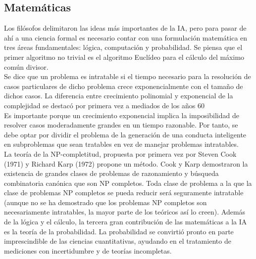 \documentclass[12pt,a4paper]{report}
\begin{document}
\subsection*{Matemáticas}
Los filósofos delimitaron las ideas más importantes de la IA, pero para pasar de ahí a una ciencia formal es necesario contar con una formulación matemática en tres áreas fundamentales: lógica, computación y probabilidad. Se piensa que el primer algoritmo no trivial es el algoritmo Euclídeo para el cálculo del máximo común divisor.\\Se dice que un problema es intratable si el tiempo necesario para la resolución de casos particulares de dicho problema crece exponencialmente con el tamaño de dichos casos. La diferencia entre crecimiento polinomial y exponencial de la complejidad se destacó por primera vez a mediados de los años 60\\
Es importante porque un crecimiento exponencial implica la imposibilidad de resolver casos moderadamente grandes en un tiempo razonable. Por tanto, se debe optar por dividir el problema de la generación de una conducta inteligente en subproblemas que sean tratables en vez de manejar problemas intratables.\\
La teoría de la NP-completitud, propuesta por primera vez por Steven Cook (1971) y Richard Karp (1972) propone un método. Cook y Karp demostraron la existencia de grandes clases de problemas de razonamiento y búsqueda combinatoria canónica que son NP completos. Toda clase de problema a la que la clase de problemas NP completos se pueda reducir será seguramente intratable (aunque no se ha demostrado que los problemas NP completos son necesariamente intratables, la mayor parte de los teóricos así lo creen).
Además de la lógica y el cálculo, la tercera gran contribución de las matemáticas a la IA es la teoría de la probabilidad. La probabilidad se convirtió pronto en parte imprescindible de las ciencias cuantitativas, ayudando en el tratamiento de mediciones con incertidumbre y de teorías incompletas.
\end{document}
